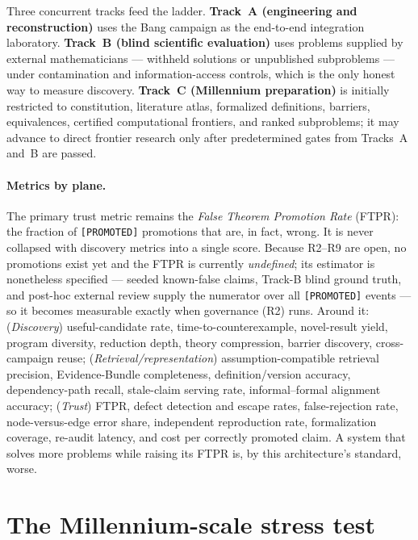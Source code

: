 \documentclass[11pt]{amsart}
\theoremstyle{definition}
\theoremstyle{remark}
\newcommand{\state}[1]{\texttt{[#1]}}
\begin{document}
Three concurrent tracks feed the ladder. \textbf{Track~A (engineering and
reconstruction)} uses the Bang campaign as the end-to-end integration
laboratory. \textbf{Track~B (blind scientific evaluation)} uses problems supplied
by external mathematicians --- withheld solutions or unpublished subproblems ---
under contamination and information-access controls, which is the only honest way
to measure discovery. \textbf{Track~C (Millennium preparation)} is initially
restricted to constitution, literature atlas, formalized definitions, barriers,
equivalences, certified computational frontiers, and ranked subproblems; it may
advance to direct frontier research only after predetermined gates from Tracks~A
and~B are passed.

\paragraph{Metrics by plane.} The primary trust metric remains the \emph{False
Theorem Promotion Rate} (FTPR): the fraction of \state{PROMOTED} promotions that
are, in fact, wrong. It is never collapsed with discovery metrics into a single
score. Because R2--R9 are open, no promotions exist yet and the FTPR is currently
\emph{undefined}; its estimator is nonetheless specified --- seeded known-false
claims, Track-B blind ground truth, and post-hoc external review supply the
numerator over all \state{PROMOTED} events --- so it becomes measurable exactly
when governance (R2) runs. Around it: (\emph{Discovery}) useful-candidate rate, time-to-counterexample,
novel-result yield, program diversity, reduction depth, theory compression,
barrier discovery, cross-campaign reuse; (\emph{Retrieval/representation})
assumption-compatible retrieval precision, Evidence-Bundle completeness,
definition/version accuracy, dependency-path recall, stale-claim serving rate,
informal--formal alignment accuracy; (\emph{Trust}) FTPR, defect detection and
escape rates, false-rejection rate, node-versus-edge error share, independent
reproduction rate, formalization coverage, re-audit latency, and cost per
correctly promoted claim. A system that solves more problems while raising its
FTPR is, by this architecture's standard, worse.

\section{The Millennium-scale stress test}\label{sec:millennium}
\end{document}
